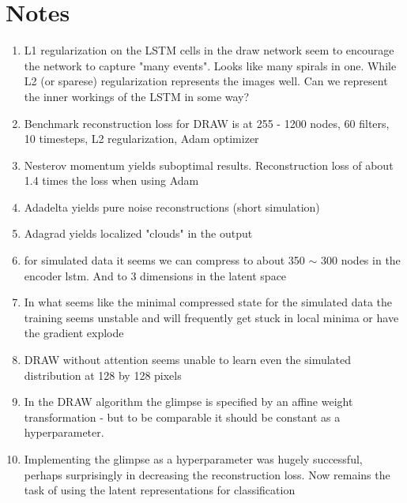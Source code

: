 \section{Notes}

\begin{enumerate}
\item L1 regularization on the LSTM cells in the draw network seem to encourage the network to capture "many events". Looks like many spirals in one. While L2 (or sparese) regularization represents the images well. Can we represent the inner workings of the LSTM in some way? 
\item Benchmark reconstruction loss for DRAW is at 255 - 1200 nodes, 60 filters, 10 timesteps, L2 regularization, Adam optimizer
\item Nesterov momentum yields suboptimal results. Reconstruction loss of about 1.4 times the loss when using Adam
\item Adadelta yields pure noise reconstructions (short simulation)
\item Adagrad yields localized "clouds" in the output
\item for simulated data it seems we can compress to about 350 $\sim$ 300 nodes in the encoder lstm. And to 3 dimensions in the latent space
\item In what seems like the minimal compressed state for the simulated data the training seems unstable and will frequently get stuck in local minima or have the gradient explode
\item DRAW without attention seems unable to learn even the simulated distribution at 128 by 128 pixels
\item In the DRAW algorithm the glimpse is specified by an affine weight transformation - but to be comparable it should be constant as a hyperparameter.
\item Implementing the glimpse as a hyperparameter was hugely successful, perhaps surprisingly in decreasing the reconstruction loss. Now remains the task of using the latent representations for classification
\end{enumerate}